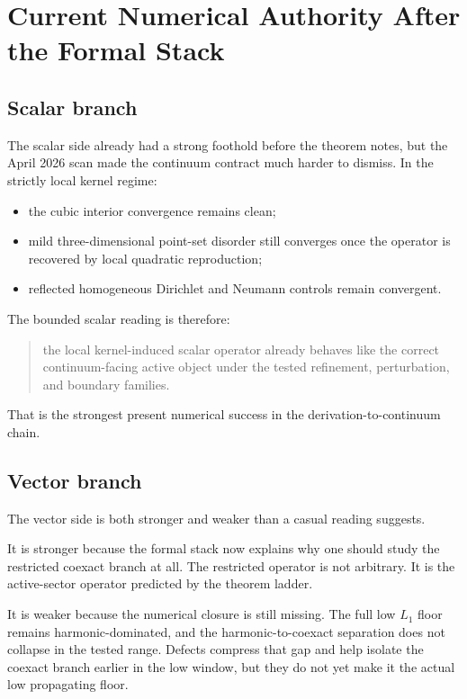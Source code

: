 \documentclass[11pt]{article}
\begin{document}
\section{Current Numerical Authority After the Formal Stack}

\subsection{Scalar branch}

The scalar side already had a strong foothold before the theorem notes, but the April 2026 scan made the continuum contract much harder to dismiss. In the strictly local kernel regime:
\begin{itemize}
\item the cubic interior convergence remains clean;
\item mild three-dimensional point-set disorder still converges once the operator is recovered by local quadratic reproduction;
\item reflected homogeneous Dirichlet and Neumann controls remain convergent.
\end{itemize}

The bounded scalar reading is therefore:
\begin{quote}
the local kernel-induced scalar operator already behaves like the correct continuum-facing active object under the tested refinement, perturbation, and boundary families.
\end{quote}

That is the strongest present numerical success in the derivation-to-continuum chain.

\subsection{Vector branch}

The vector side is both stronger and weaker than a casual reading suggests.

It is stronger because the formal stack now explains why one should study the restricted coexact branch at all. The restricted operator is not arbitrary. It is the active-sector operator predicted by the theorem ladder.

It is weaker because the numerical closure is still missing. The full low $L_1$ floor remains harmonic-dominated, and the harmonic-to-coexact separation does not collapse in the tested range. Defects compress that gap and help isolate the coexact branch earlier in the low window, but they do not yet make it the actual low propagating floor.
\end{document}
